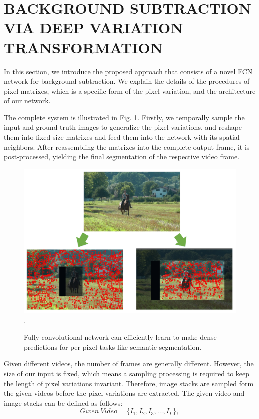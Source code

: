 \documentclass[journal]{IEEEtran}
\newcommand{\reffig}[1]{Fig. \ref{#1}}
\begin{document}

\section{BACKGROUND SUBTRACTION VIA DEEP VARIATION TRANSFORMATION}
\label{sec4}
In this section, we introduce the proposed approach that consists of a novel FCN network for background subtraction. 
We explain the details of the procedures of pixel matrixes, which is a specific form of the pixel variation, and the architecture of our network. 


The complete system is illustrated in \reffig{flow_chart}. 
Firstly, we temporally sample the input and ground truth images to generalize the pixel variations, and reshape them into fixed-size matrixes and feed them into the network with its spatial neighbors. 
After reassembling the matrixes into the complete output frame, it is post-processed, yielding the final segmentation of the respective video frame.
\begin{figure}[!t] %
\centering
\includegraphics[width=\textwidth]{figure/fig2}
\DeclareGraphicsExtensions.
    \caption{Fully convolutional network can efficiently learn to make dense predictions for per-pixel tasks like semantic segmentation.}
    \label{flow_chart}
\end{figure}


Given different videos, the number of frames are generally different. 
However, the size of our input is fixed, which means a sampling processing is required to keep the length of pixel variations invariant. 
Therefore, image stacks are sampled form the given videos before the pixel variations are extracted. 
The given video and image stacks can be defined as follows: 
\begin{equation}
	Given \  Video=\{ I_1,I_2,I_3,\dots,I_L\} ,
\end{equation}
\end{document}
